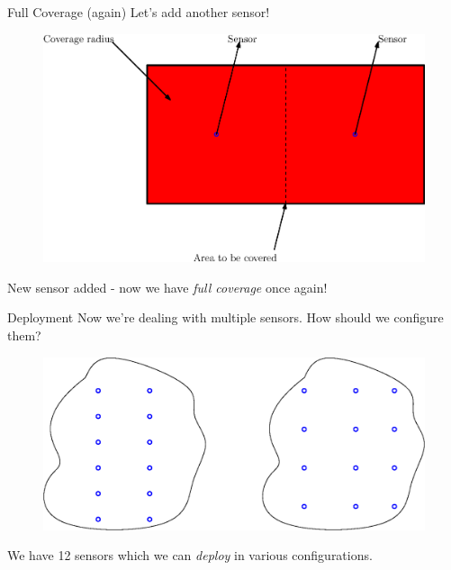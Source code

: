 \documentclass[t]{beamer}
\begin{document}
\begin{frame}[label=motivation5]{Full Coverage (again)}
Let's add another sensor!

\begin{figure}[b]
\includegraphics[scale=0.5]{motivation/partial-coverage-to-full.eps}
\end{figure}
New sensor added - now we have \emph{full coverage} once again!
\end{frame}
\begin{frame}[label=motivation6]{Deployment}
Now we're dealing with multiple sensors. How should we configure them?

\begin{figure}[b]
\includegraphics[scale=0.5]{motivation/deployment-configuration.eps}
\end{figure}
We have 12 sensors which we can \emph{deploy} in various configurations.
\end{frame}
\end{document}
